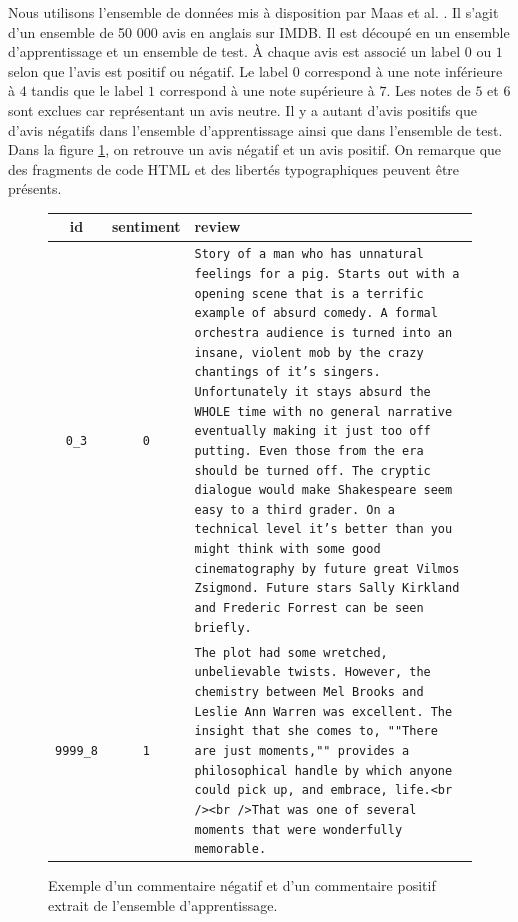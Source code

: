 \documentclass{article}
\begin{document}

Nous utilisons l'ensemble de données mis à disposition par Maas et al. \cite{maas-EtAl:2011:ACL-HLT2011}. Il s'agit d'un ensemble de 50 000 avis en anglais sur IMDB. Il est découpé en un ensemble d'apprentissage et un ensemble de test. À chaque avis est associé un label $0$ ou $1$ selon que l'avis est positif ou négatif. Le label $0$ correspond à une note inférieure à $4$ tandis que le label $1$ correspond à une note supérieure à $7$. Les notes de $5$ et $6$ sont exclues car représentant un avis neutre. Il y a autant d'avis positifs que d'avis négatifs dans l'ensemble d'apprentissage ainsi que dans l'ensemble de test. Dans la figure \ref{example_imdb}, on retrouve un avis négatif et un avis positif. On remarque que des fragments de code HTML et des libertés typographiques peuvent être présents.

\begin{figure}[h]
\begin{center}
\begin{tabular}{|c|c|p{80mm}|}
	\hline
	id & sentiment & review \\
	\hline
	\texttt{0\_3} & \texttt{0} & \texttt{Story of a man who has unnatural feelings for a pig. Starts out with a opening scene that is a terrific example of absurd comedy. A formal orchestra audience is turned into an insane, violent mob by the crazy chantings of it's singers. Unfortunately it stays absurd the WHOLE time with no general narrative eventually making it just too off putting. Even those from the era should be turned off. The cryptic dialogue would make Shakespeare seem easy to a third grader. On a technical level it's better than you might think with some good cinematography by future great Vilmos Zsigmond. Future stars Sally Kirkland and Frederic Forrest can be seen briefly.} \\
	\hline
	\texttt{9999\_8} & \texttt{1} & \texttt{The plot had some wretched, unbelievable twists. However, the chemistry between Mel Brooks and Leslie Ann Warren was excellent. The insight that she comes to, ""There are just moments,"" provides a philosophical handle by which anyone could pick up, and embrace, life.<br /><br />That was one of several moments that were wonderfully memorable.} \\
	\hline
\end{tabular}
\caption{Exemple d'un commentaire négatif et d'un commentaire positif extrait de l'ensemble d'apprentissage.}
\label{example_imdb}
\end{center}
\end{figure}
\end{document}

